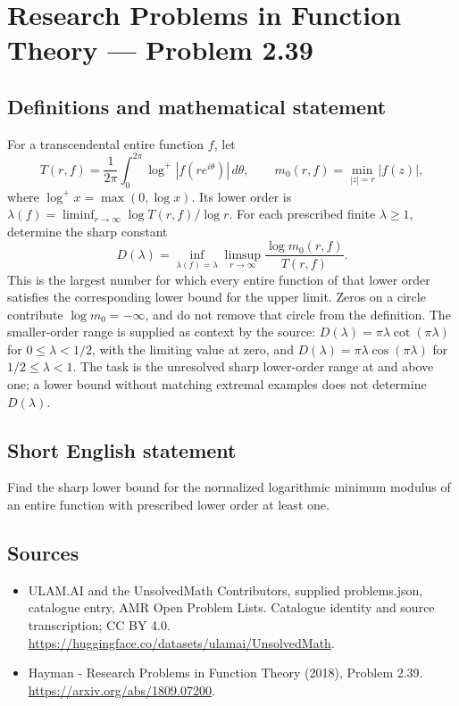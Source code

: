 \documentclass[11pt,a4paper]{article}
\begin{document}
\section*{Research Problems in Function Theory — Problem 2.39}\label{statement}

\subsection{Definitions and mathematical statement}
For a transcendental entire function $f$, let
\[
T(r,f)=\frac1{2\pi}\int_0^{2\pi}\log^+|f(re^{i\theta})|\,d\theta,
\qquad m_0(r,f)=\min_{|z|=r}|f(z)|,
\]
where $\log^+x=\max(0,\log x)$. Its lower order is
$\lambda(f)=\liminf_{r\to\infty}\log T(r,f)/\log r$.
For each prescribed finite $\lambda\ge1$, determine the sharp constant
\[
D(\lambda)=\inf_{\lambda(f)=\lambda}
\limsup_{r\to\infty}\frac{\log m_0(r,f)}{T(r,f)}.
\]
This is the largest number for which every entire function of that lower order satisfies the corresponding lower bound for the upper limit. Zeros on a circle contribute $\log m_0=-\infty$, and do not remove that circle from the definition.
The smaller-order range is supplied as context by the source:
$D(\lambda)=\pi\lambda\cot(\pi\lambda)$ for $0\le\lambda<1/2$, with the limiting value at zero, and $D(\lambda)=\pi\lambda\cos(\pi\lambda)$ for $1/2\le\lambda<1$.
The task is the unresolved sharp lower-order range at and above one; a lower bound without matching extremal examples does not determine $D(\lambda)$.
\subsection{Short English statement}
Find the sharp lower bound for the normalized logarithmic minimum modulus of an entire function with prescribed lower order at least one.
\subsection{Sources}
\begin{itemize}
\item[S1] ULAM.AI and the UnsolvedMath Contributors, supplied problems.json, catalogue entry, AMR Open Problem Lists. Catalogue identity and source transcription; CC BY 4.0.
\url{https://huggingface.co/datasets/ulamai/UnsolvedMath}.
\item[S2] Hayman - Research Problems in Function Theory (2018), Problem 2.39. 
\url{https://arxiv.org/abs/1809.07200}.
\end{itemize}
\end{document}
